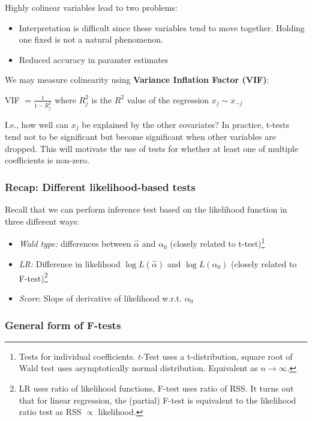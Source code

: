 \documentclass[11pt, %
	oneside, %
	english, %
	onehalfspacing, %
	]{article} %
\numberwithin{equation}{section}
\begin{document}
Highly colinear variables lead to two problems:

\begin{itemize}
    \item Interpretation is difficult since these variables tend to move together. Holding one fixed is not a natural phenomenon.
    \item Reduced accuracy in paramter estimates
\end{itemize}

We may measure colinearity using \textbf{Variance Inflation Factor (VIF)}:

\begin{center}
    VIF $=\frac{1}{1-R_j^2}$ where $R_j^2$ is the $R^2$ value of the regression $x_j \sim x_{-j}$
\end{center}
I.e., how well can $x_j$ be explained by the other covariates? In practice, t-tests tend not to be significant but become significant when other variables are dropped. This will motivate the use of tests for whether at least one of multiple coefficients is non-zero.

\subsubsection*{Recap: Different likelihood-based tests}

Recall that we can perform inference test based on the likelihood function in three different ways:
\begin{itemize}
    \item \emph{Wald type:} differences between $\hat{\alpha}$ and $\alpha_0$ (closely related to t-test)\footnote{Tests for individual coefficients. $t$-Test uses a t-distribution, square root of Wald test uses asymptotically normal distribution. Equivalent as $n\to \infty$.}
    \item \emph{LR:} Difference in likelihood $\log L(\hat{\alpha})$ and $\log L({\alpha}_0)$ (closely related to F-test)\footnote{LR uses ratio of likelihood functions, F-test uses ratio of RSS. It turns out that for linear regression, the (partial) F-test is equivalent to the likelihood ratio test as RSS $\propto$ likelihood.}
    \item \emph{Score}: Slope of derivative of likelihood w.r.t. $\alpha_0$
\end{itemize}

\subsubsection*{General form of F-tests}
\end{document}
